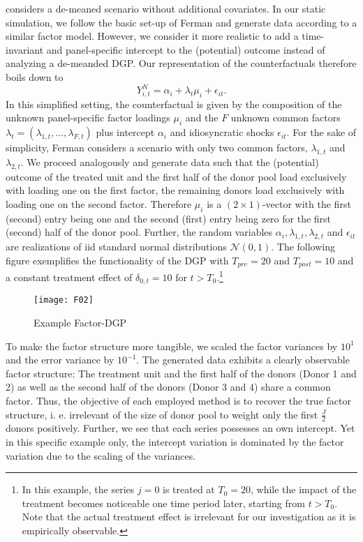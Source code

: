 \cite{ferman:2021} considers a de-meaned scenario without additional covariates. In our static simulation, we follow the basic set-up of Ferman and generate data according to a similar factor model. However, we consider it more realistic to add a time-invariant and panel-specific intercept to the (potential) outcome instead of analyzing a de-meanded \ac{DGP}. Our representation of the counterfactuals therefore boils down to 
\begin{equation*}
	Y_{i,t}^{N} = \alpha_i + \lambda_t \mu_i + \epsilon_{it}.
\end{equation*}
In this simplified setting, the counterfactual is given by the composition of the unknown panel-specific factor loadings $\mu_i$ and the $F$ unknown common factors $\lambda_t = (\lambda_{1,t}, ..., \lambda_{F,t})$ plus intercept $\alpha_i$ and idiosyncratic shocks $\epsilon_{it}$. For the sake of simplicity, Ferman considers a scenario with only two common factors, $\lambda_{1,t}$ and $\lambda_{2,t}$. We proceed analogously and generate data such that the (potential) outcome of the treated unit and the first half of the donor pool load exclusively with loading one on the first factor, the remaining donors load exclusively with loading one on the second factor. Therefore $\mu_i$ is a $(2 \times 1)$-vector with the first (second) entry being one and the second (first) entry being zero for the first (second) half of the donor pool. Further, the random variables $\alpha_i, \lambda_{1,t}, \lambda_{2,t}$ and $\epsilon_{it}$ are realizations of \ac{iid} standard normal distributions $\mathcal{N}(0,1)$. The following figure exemplifies the functionality of the \ac{DGP} with $T_{pre} = 20$ and $T_{post} = 10$ and a constant treatment effect of $\delta_{0,t} = 10$ for $t > T_0$.\footnote{In this example, the series $j = 0$ is treated at $T_0 = 20$, while the impact of the treatment becomes noticeable one time period later, starting from $t > T_0$. Note that the actual treatment effect is irrelevant for our investigation as it is empirically observable.}  
\begin{figure}[H]
	\centering
	\texttt{[image: F02]}
	\caption{Example Factor-\ac{DGP}}
	\label{F_02}
\end{figure}
To make the factor structure more tangible, we scaled the factor variances by $10^1$ and the error variance by $10^{-1}$. The generated data exhibits a clearly observable factor structure: The treatment unit and the first half of the donors (Donor 1 and 2) as well as the second half of the donors (Donor 3 and 4) share a common factor. Thus, the objective of each employed method is to recover the true factor structure, i. e. irrelevant of the size of donor pool to weight only the first $\frac{J}{2}$ donors positively. Further, we see that each series possesses an own intercept. Yet in this specific example only, the intercept variation is dominated by the factor variation due to the scaling of the variances.

